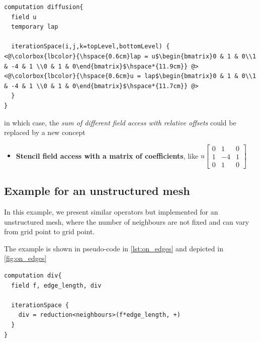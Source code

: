 \documentclass[a4paper,10pt]{scrartcl}
\begin{document}
\begin{lstlisting}
computation diffusion{
  field u
  temporary lap
  
  iterationSpace(i,j,k=topLevel,bottomLevel) {
<@\colorbox{lbcolor}{\hspace{0.6cm}lap = u$\begin{bmatrix}0 & 1 & 0\\1 & -4 & 1 \\0 & 1 & 0\end{bmatrix}$\hspace*{11.9cm}} @>
<@\colorbox{lbcolor}{\hspace{0.6cm}u = lap$\begin{bmatrix}0 & 1 & 0\\1 & -4 & 1 \\0 & 1 & 0\end{bmatrix}$\hspace*{11.7cm}} @>
  }
}
\end{lstlisting}

in which case, the \textit{sum of different field access with relative offsets} could be replaced by a new concept
\begin{itemize}
	\item \textbf{Stencil field access with a matrix of coefficients}, like $u\begin{bmatrix}0 & 1 & 0\\1 & -4 & 1 \\0 & 1 & 0\end{bmatrix}$
\end{itemize}

\subsection{Example for an unstructured mesh}

In this example, we present similar operators but implemented for an unstructured mesh, where the number of neighbours
are not fixed and can vary from grid point to grid point.


The example is shown in pseudo-code in \cref{lst:on_edges} and depicted in \cref{fig:on_edges}

\begin{lstlisting}[label=lst:on_edges, caption=Pseudo-code example of operator on neighbour grid points on an irregular grid]
computation div{
  field f, edge_length, div
  
  iterationSpace {
    div = reduction<neighbours>(f*edge_length, +)
  }
}
\end{lstlisting}
\end{document}
